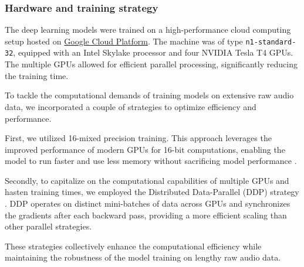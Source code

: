 \subsubsection{Hardware and training strategy}

The deep learning models were trained on a high-performance cloud computing setup hosted on \href{https://cloud.google.com/}{Google Cloud Platform}. The machine was of type \texttt{n1-standard-32}, equipped with an Intel Skylake processor and four NVIDIA Tesla T4 GPUs. The multiple GPUs allowed for efficient parallel processing, significantly reducing the training time.

To tackle the computational demands of training models on extensive raw audio data, we incorporated a couple of strategies to optimize efficiency and performance. 

First, we utilized 16-mixed precision training. This approach leverages the improved performance of modern GPUs for 16-bit computations, enabling the model to run faster and use less memory without sacrificing model performance \cite{Das2018MixedOperations}.

Secondly, to capitalize on the computational capabilities of multiple GPUs and hasten training times, we employed the Distributed Data-Parallel (DDP) strategy \cite{Li2020PyTorchTraining}. DDP operates on distinct mini-batches of data across GPUs and synchronizes the gradients after each backward pass, providing a more efficient scaling than other parallel strategies. 

These strategies collectively enhance the computational efficiency while maintaining the robustness of the model training on lengthy raw audio data.

\newpage